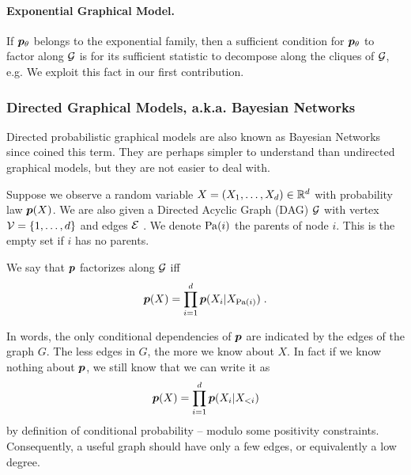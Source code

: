 \paragraph{Exponential Graphical Model.}
If $\bm{p}_{\theta}$ belongs to the exponential family, then a sufficient condition for $\bm{p}_{\theta}$  to factor along ${\mathcal G}$ is for its sufficient statistic to decompose along the cliques of ${\mathcal G}$, e.g.
We exploit this fact in our first contribution.


\subsubsection{Directed Graphical Models, a.k.a. Bayesian Networks} 
Directed probabilistic graphical models are also known as Bayesian Networks since \citet{pearl1985bayesian} coined this term.
They are perhaps simpler to understand than undirected graphical models, but they are not easier to deal with.

Suppose we observe a random variable $X=(X_1, \dots, X_d) \in \mathbb{R}^d$ with probability law $\bm{p}(X)$. 
We are also given a Directed Acyclic Graph (DAG) ${\mathcal G}$ with vertex ${\mathcal V}=\{1, \dots, d \}$ and edges ${\mathcal E}$ . 
We denote $\operatorname{\mathrm{Pa}}(i)$ the parents of node $i$. 
This is the empty set if $i$ has no parents. 
\begin{definition}
We say that $\bm{p}$ factorizes along ${\mathcal G}$ iff
\begin{align}
    \bm{p}(X) = \prod_{i=1}^d \bm{p}(X_i | X_{\operatorname{\mathrm{Pa}}(i)}) \; .
\end{align}
\end{definition}
In words, the only conditional dependencies of $\bm{p}$ are indicated by the edges of the graph $G$. The less edges in $G$, the more we know about $X$. In fact if we know nothing about $\bm{p}$, we still know that we can write it as 
\begin{align}
    \bm{p}(X) = \prod_{i=1}^d \bm{p}(X_i | X_{<i} )
\end{align}
by definition of conditional probability -- modulo some positivity constraints. Consequently, a useful graph should have only a few edges, or equivalently a low degree.

